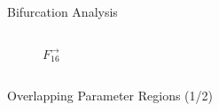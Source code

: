 \begin{frame}{Bifurcation Analysis}
\begin{columns}
\begin{column}{.5 \textwidth}
\begin{figure}
{					\caption*{$F_{16}^\rightarrow$}
				}
			\end{figure}
		\end{column}
	\end{columns}
\end{frame}

\begin{frame}{Overlapping Parameter Regions (1/2)}
	\vspace{-1em}
	\begin{columns}
		\begin{column}{.8 \textwidth}
			\begin{figure}
				\centering
\end{figure}
\end{column}
\end{columns}
\end{frame}
